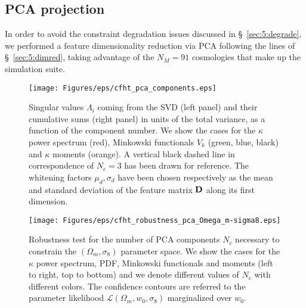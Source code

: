 \subsection{PCA projection}
In order to avoid the constraint degradation issues discussed in \S~\ref{sec:5:degrade}, we performed a feature dimensionality reduction via PCA following the lines of \S~\ref{sec:5:dimred}, taking advantage of the $N_M=91$ cosmologies that make up the  simulation suite. 
%
\begin{figure}
\begin{center}
\texttt{[image: Figures/eps/cfht\_pca\_components.eps]}
\end{center}
\caption{Singular values $\Lambda_i$ coming from the SVD (left panel) and their cumulative sums (right panel) in units of the total variance, as a function of the component number. We show the cases for the $\kappa$ power spectrum (red), Minkowski functionals $V_k$ (green, blue, black) and $\kappa$ moments (orange). A vertical black dashed line in correspondence of $N_c=3$ has been drawn for reference. The whitening factors $\mu_d,\sigma_d$ have been chosen respectively as the mean and standard deviation of the feature matrix $\mathbf{D}$ along its first dimension.}
\label{fig:6:pcacomp}
\end{figure} 
%
\begin{figure}
\begin{center}
\texttt{[image: Figures/eps/cfht\_robustness\_pca\_Omega\_m-sigma8.eps]}
\end{center}
\caption{Robustness test for the number of PCA components $N_c$ necessary to constrain the $(\Omega_m,\sigma_8)$ parameter space. We show the cases for the $\kappa$ power spectrum, PDF, Minkowski functionals and moments (left to right, top to bottom) and we denote different values of $N_c$ with different colors. The confidence contours are referred to the parameter likelihood $\mathcal{L}(\Omega_m,w_0,\sigma_8)$ marginalized over $w_0$.}
\label{fig:6:robustness}
\end{figure}
%
